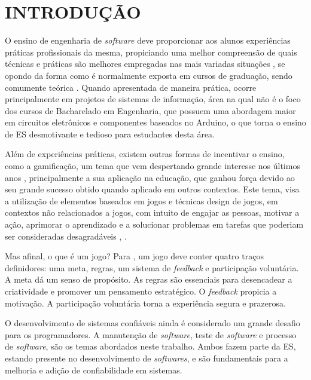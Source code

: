 
\chapter{INTRODUÇÃO}
\label{chap:introducao}

O ensino de engenharia de \textit{software} deve proporcionar aos alunos experiências práticas profissionais da mesma, propiciando uma melhor compreensão de quais técnicas e práticas são melhores empregadas nas mais variadas situações \cite{Figueiredo2017}, se opondo da forma como é normalmente exposta em cursos de graduação, sendo comumente teórica \cite{Souza2010}. Quando apresentada de maneira prática, ocorre principalmente em projetos de sistemas de informação, área na qual não é o foco dos cursos de Bacharelado em Engenharia, que possuem uma abordagem maior em circuitos eletrônicos e componentes baseados no Arduino, o que torna o ensino de ES desmotivante e tedioso para estudantes desta área.

Além de experiências práticas, existem outras formas de incentivar o ensino, como a gamificação, um tema que vem despertando grande interesse nos últimos anos \cite{Kapp2012}, principalmente a sua aplicação na educação, que ganhou força devido ao seu grande sucesso obtido quando aplicado em outros contextos. Este tema, visa a utilização de elementos baseados em jogos e técnicas design de jogos, em contextos não relacionados a jogos, com intuito de engajar as pessoas, motivar a ação, aprimorar o aprendizado e a solucionar problemas em tarefas que poderiam ser consideradas desagradáveis \cite{Deterding2011}, \cite{Kapp2012}.

Mas afinal, o que é um jogo? Para \cite{McGonigal2011}, um jogo deve conter quatro traços definidores: uma meta, regras, um sistema de \textit{feedback} e participação voluntária. A meta dá um senso de propósito. As regras são essenciais para desencadear a criatividade e promover um pensamento estratégico. O \textit{feedback} propicia a motivação. A participação voluntária torna a experiência segura e prazerosa.

O desenvolvimento de sistemas confiáveis ainda é considerado um grande desafio para os programadores. A manutenção de \textit{software}, teste de \textit{software} e processo de \textit{software}, são os temas abordados neste trabalho. Ambos fazem parte da ES, estando presente no desenvolvimento de \textit{softwares}, e são fundamentais para a melhoria e adição de confiabilidade em sistemas.  

